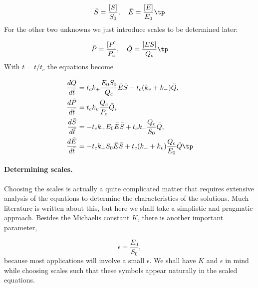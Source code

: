 \documentclass[graybox,envcountchap,sectrefs,final]{svmonodo}
\begin{document}
\[ \bar S = \frac{[S]}{S_0},\quad
\bar E = \frac{[E]}{E_0}\tp\]
For the other two unknowns we just introduce scales to be determined
later:

\[
\bar P = \frac{[P]}{P_c},\quad
\bar{Q} = \frac{[ES]}{Q_c}\tp
\]
With $\bar t = t/t_c$ the equations become

\begin{align*}
\frac{d\bar Q}{d\bar t} &= t_ck_+\frac{E_0S_0}{Q_c}\bar E\bar S
- t_c(k_v + k_-)\bar Q,\\ 
\frac{d\bar P}{d\bar t} &= t_ck_v\frac{Q_c}{P_c}\bar Q,\\ 
\frac{d\bar S}{d\bar t} &= -t_ck_+E_0\bar E\bar S
+ t_ck_-\frac{Q_c}{S_0}\bar Q,\\ 
\frac{d\bar E}{d\bar t} &= -t_ck_+S_0\bar E\bar S
+ t_c(k_- + k_v)\frac{Q_c}{E_0}\bar Q\tp
\end{align*}

\paragraph{Determining scales.}
Choosing the scales is actually a quite complicated matter that requires
extensive analysis of the equations to determine the characteristics of
the solutions. Much literature is written about this, but here we shall
take a simplistic and pragmatic approach.
Besides the Michaelis constant $K$, there is another important parameter,

\[ \epsilon = \frac{E_0}{S_0},\]
because most applications will involve a small $\epsilon$.
We shall have $K$ and $\epsilon$ in mind while choosing scales such that
these symbols appear naturally in the scaled equations.
\end{document}
